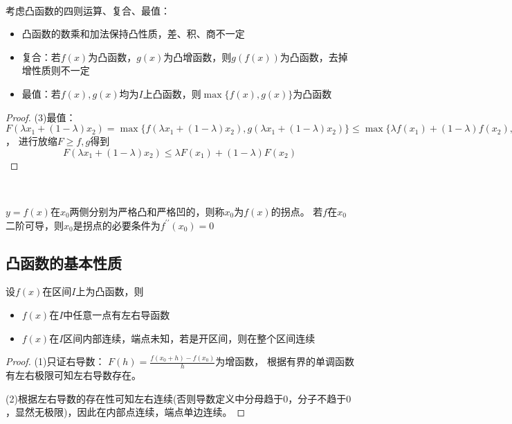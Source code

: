 ~

\begin{theorem}[凸性质的保持]
  考虑凸函数的四则运算、复合、最值：
  \begin{itemize}
  \item 凸函数的数乘和加法保持凸性质，差、积、商不一定
  \item 复合：若$f(x)$为凸函数，$g(x)$为凸增函数，则$g(f(x))$为凸函数，去掉增性质则不一定
  \item 最值：若$f(x),g(x)$均为$I$上凸函数，则$\max\{f(x),g(x)\}$为凸函数
  \end{itemize}
\end{theorem}

\begin{proof}
  (3)最值：$F(\lambda x_1 + (1 - \lambda)x_2) = \max \{f(\lambda x_1 + (1 - \lambda)x_2), g(\lambda x_1 + (1 - \lambda)x_2)\} \leq \max \{\lambda f(x_1) + (1 - \lambda)f(x_2), \lambda g(x_1) + (1 - \lambda)g(x_2)\}$，
  进行放缩$F \geq f,g$得到
  \begin{equation*}
    F(\lambda x_1 + (1 - \lambda)x_2) \leq \lambda F(x_1) + (1 - \lambda)F(x_2)
  \end{equation*}
\end{proof}

~

\begin{definition}[拐点]
  $y = f(x)$在$x_0$两侧分别为严格凸和严格凹的，则称$x_0$为$f(x)$的拐点。
  若$f$在$x_0$二阶可导，则$x_0$是拐点的必要条件为$f^{\prime\prime}(x_0) = 0$
\end{definition}

\subsection{凸函数的基本性质}

\begin{theorem}[凸函数基本性质]
  设$f(x)$在区间$I$上为凸函数，则
  \begin{itemize}
  \item $f(x)$在$I$中任意一点有左右导函数
  \item $f(x)$在$I$区间内部连续，端点未知，若是开区间，则在整个区间连续
  \end{itemize}
\end{theorem}

\begin{proof}
  (1)只证右导数：
  $F(h) = \frac{f(x_0 + h) - f(x_0)}{h}$为增函数，
  根据有界的单调函数有左右极限可知左右导数存在。

  (2)根据左右导数的存在性可知左右连续(否则导数定义中分母趋于$0$，分子不趋于$0$，显然无极限)，因此在内部点连续，端点单边连续。
\end{proof}

